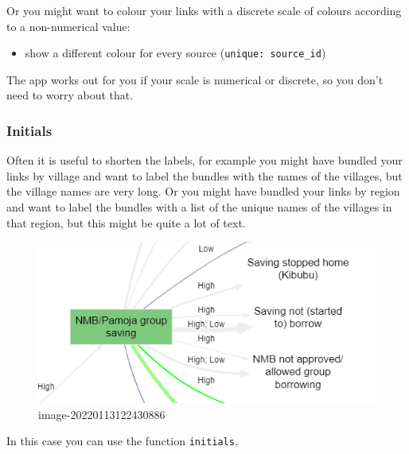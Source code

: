 \documentclass[
]{book}
\providecommand{\tightlist}{%
  \setlength{\itemsep}{0pt}\setlength{\parskip}{0pt}}
\begin{document}
Or you might want to colour your links with a discrete scale of colours according to a non-numerical value:

\begin{itemize}
\tightlist
\item
  show a different colour for every source (\texttt{unique:\ source\_id})
\end{itemize}

The app works out for you if your scale is numerical or discrete, so you don't need to worry about that.

\hypertarget{xinitials}{%
\subsubsection{Initials}\label{xinitials}}

Often it is useful to shorten the labels, for example you might have bundled your links by village and want to label the bundles with the names of the villages, but the village names are very long. Or you might have bundled your links by region and want to label the bundles with a list of the unique names of the villages in that region, but this might be quite a lot of text.

\begin{figure}
\centering
\includegraphics{_assets/image-20220113122430886.png}
\caption{image-20220113122430886}
\end{figure}

In this case you can use the function \texttt{initials}.
\end{document}
